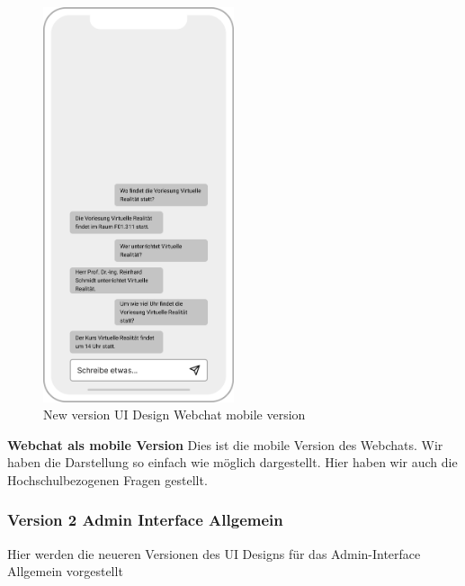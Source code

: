 \begin{figure}[H]
    \centering
    \includegraphics[width=0.5\textwidth]{bilder/new vers. UI Design/WebChat/mobile Version Webchat.png}
    \caption{New version UI Design Webchat mobile version}
    \label{fig:New version UI Design Webchat mobile version}
    \end{figure}
\noindent \textbf{Webchat als mobile Version} \newline
Dies ist die mobile Version des Webchats. Wir haben die Darstellung so einfach wie möglich dargestellt.
Hier haben wir auch die Hochschulbezogenen Fragen gestellt.

\newpage

\subsubsection{Version 2 Admin Interface Allgemein}
Hier werden die neueren Versionen des UI Designs für das Admin-Interface Allgemein vorgestellt


